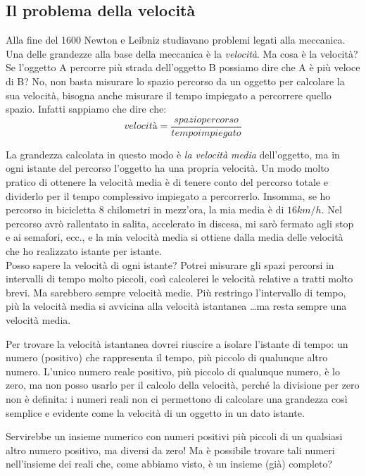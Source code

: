 \subsection{Il problema della velocità}
\label{subsec:insnum_velocita}

Alla fine del 1600 Newton e Leibniz studiavano problemi legati alla meccanica. 
Una delle grandezze alla base della meccanica è la \emph{velocità}. Ma cosa è 
la velocità? Se l'oggetto A percorre più strada dell'oggetto B possiamo dire 
che A è più veloce di B? No, non basta misurare lo spazio percorso da un 
oggetto per calcolare la sua velocità, bisogna anche misurare il tempo 
impiegato a percorrere quello spazio. Infatti sappiamo che dire che:
\[velocità = \frac{spazio percorso}{tempo impiegato}\]

La grandezza calcolata in questo modo è \emph{la velocità media} dell'oggetto, 
ma in ogni istante del percorso l'oggetto ha una propria velocità. 
Un modo molto pratico di ottenere la velocità media è di tenere conto 
del percorso totale e dividerlo per il tempo complessivo impiegato a percorrerlo.
Insomma, se ho percorso in bicicletta  \(8\) chilometri in mezz'ora, la mia media è 
di  \(16 km/h\). Nel percorso avrò rallentato in salita, accelerato in discesa, 
mi sarò fermato agli stop e ai semafori, ecc., e la mia velocità media si ottiene
dalla media delle velocità che ho realizzato istante per istante.\\
Posso sapere la velocità di ogni istante? Potrei misurare gli spazi percorsi in  
intervalli di tempo molto piccoli, così calcolerei le velocità relative a tratti 
molto brevi. Ma sarebbero sempre velocità medie. Più 
restringo l'intervallo di tempo, più la velocità media si avvicina alla 
velocità istantanea \dots ma resta sempre una velocità media.

Per trovare la velocità istantanea dovrei riuscire a isolare l'istante di tempo:
un numero (positivo) che rappresenta il tempo, più piccolo di qualunque altro numero.
L'unico numero reale positivo, più piccolo di qualunque numero, è lo zero, ma non posso
usarlo per il calcolo della velocità, perché la divisione per 
zero non è definita: i numeri reali non ci permettono di calcolare una 
grandezza così semplice e evidente come la velocità di un oggetto in un dato 
istante.

Servirebbe un insieme numerico con numeri positivi più piccoli di un 
qualsiasi altro numero positivo, ma diversi da zero! Ma è possibile 
trovare tali numeri nell'insieme dei reali che, come abbiamo visto, 
è un insieme (già) completo?



